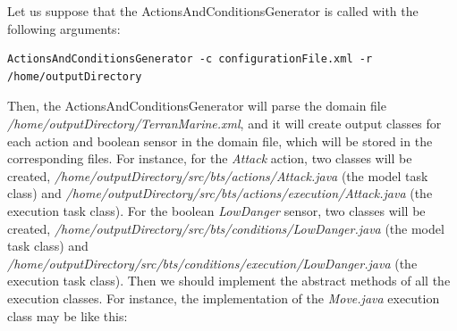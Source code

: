 \documentclass[a4paper]{article}
\begin{document}
Let us suppose that the ActionsAndConditionsGenerator is called with the following arguments:

\begin{verbatim}
ActionsAndConditionsGenerator -c configurationFile.xml -r /home/outputDirectory
\end{verbatim}

Then, the ActionsAndConditionsGenerator will parse the domain file \textit{/home/outputDirectory/\-TerranMarine.xml}, and it will create output classes for each action and boolean sensor in the domain file, which will be stored in the corresponding files. For instance, for the \textit{Attack} action, two classes will be created, \textit{/home/outputDirectory/src/bts/actions/Attack.java} (the model task class) and \textit{/home/outputDirectory/src/bts/actions/execution/Attack.java} (the execution task class). For the boolean \textit{LowDanger} sensor, two classes will be created, \textit{/home/outputDirectory/src/bts/conditions/LowDanger.java} (the model task class) and \textit{/home/outputDirectory/src/bts/conditions/execution/LowDanger.java} (the execution task class). Then we should implement the abstract methods of all the execution classes. For instance, the implementation of the \textit{Move.java} execution class may be like this:
\end{document}
